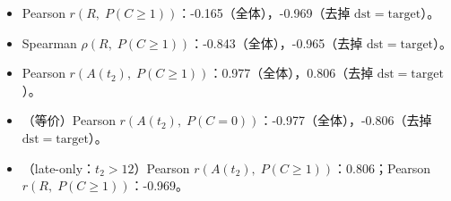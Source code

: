 \begin{itemize}
  \item Pearson $r(R,\;P(C\ge1))$：-0.165（全体），-0.969（去掉 $\mathrm{dst}=\mathrm{target}$）。
  \item Spearman $\rho(R,\;P(C\ge1))$：-0.843（全体），-0.965（去掉 $\mathrm{dst}=\mathrm{target}$）。
  \item Pearson $r(A(t_2),\;P(C\ge1))$：0.977（全体），0.806（去掉 $\mathrm{dst}=\mathrm{target}$）。
  \item （等价）Pearson $r(A(t_2),\;P(C=0))$：-0.977（全体），-0.806（去掉 $\mathrm{dst}=\mathrm{target}$）。
  \item （late-only：$t_2>12$）Pearson $r(A(t_2),\;P(C\ge1))$：0.806；Pearson $r(R,\;P(C\ge1))$：-0.969。
\end{itemize}
